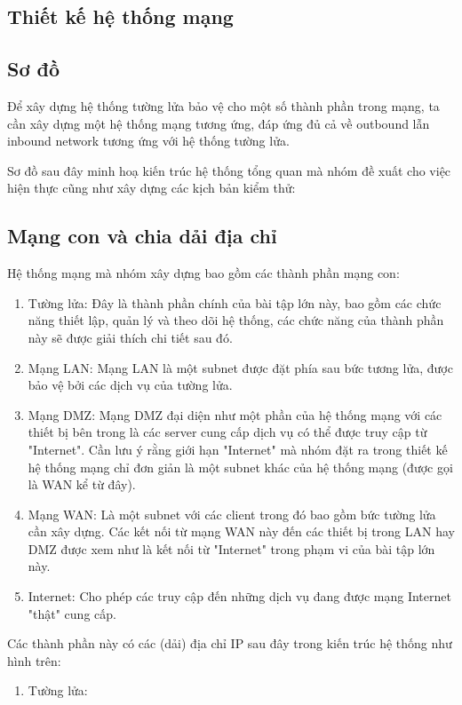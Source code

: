 \documentclass[12pt,titlepage,a4paper]{article}
\begin{document}
	\subsection{Thiết kế hệ thống mạng}
	\subsection{Sơ đồ}
	Để xây dựng hệ thống tường lửa bảo vệ cho một số thành phần trong mạng, ta cần xây dựng một hệ thống mạng tương ứng, đáp ứng đủ cả về outbound lẫn inbound network tương ứng với hệ thống tường lửa.
	\par
	Sơ đồ sau đây minh hoạ kiến trúc hệ thống tổng quan mà nhóm đề xuất cho việc hiện thực cũng như xây dựng các kịch bản kiểm thử:
	
	
	\subsection{Mạng con và chia dải địa chỉ}
	Hệ thống mạng mà nhóm xây dựng bao gồm các thành phần mạng con:
	\begin{enumerate}
		\item Tường lửa: Đây là thành phần chính của bài tập lớn này, bao gồm các chức năng thiết lập, quản lý và theo dõi hệ thống, các chức năng của thành phần này sẽ được giải thích chi tiết sau đó.
		\item Mạng LAN: Mạng LAN là một subnet được đặt phía sau bức tương lửa, được bảo vệ bởi các dịch vụ của tường lửa.
		\item Mạng DMZ: Mạng DMZ đại diện như một phần của hệ thống mạng với các thiết bị bên trong là các server cung cấp dịch vụ có thể được truy cập từ "Internet". Cần lưu ý rằng giới hạn "Internet" mà nhóm đặt ra trong thiết kế hệ thống mạng chỉ đơn giản là một subnet khác của hệ thống mạng (được gọi là WAN kể từ đây).
		\item Mạng WAN: Là một subnet với các client trong đó bao gồm bức tường lửa cần xây dựng. Các kết nối từ mạng WAN này đến các thiết bị trong LAN hay DMZ được xem như là kết nối từ "Internet" trong phạm vi của bài tập lớn này.
		\item Internet: Cho phép các truy cập đến những dịch vụ đang được mạng Internet "thật" cung cấp.
	\end{enumerate}
	Các thành phần này có các (dải) địa chỉ IP sau đây trong kiến trúc hệ thống như hình trên:
	\begin{enumerate}
		\item Tường lửa: 
	\end{enumerate}
	
\end{document}
